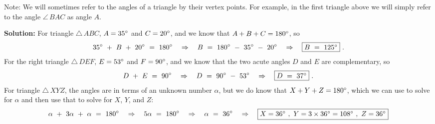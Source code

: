 \begin{exmp}
\begin{center}
 \end{center}
\par\noindent Note: We will sometimes refer to the angles of a triangle by their vertex
points. For example, in the first triangle above we will simply refer to the angle $\angle\,BAC$
as angle $A$.\vspace{1mm}
\par\noindent\textbf{Solution:} For triangle $\triangle\,ABC$, $A = 35^\circ$ and $C = 20^\circ$,
and we know that $A + B + C = 180^\circ$, so
 \begin{displaymath}
  35^\circ ~+~ B ~+~ 20^\circ ~=~ 180^\circ \quad\Rightarrow\quad B ~=~ 180^\circ ~-~
   35^\circ ~-~ 20^\circ \quad\Rightarrow\quad \fbox{$B ~=~ 125^\circ$} ~.
 \end{displaymath}
 For the right triangle $\triangle\,DEF$, $E = 53^\circ$ and $F = 90^\circ$, and we know that
 the two acute angles $D$ and $E$ are complementary, so
 \begin{displaymath}
  D ~+~ E ~=~ 90^\circ \quad\Rightarrow\quad D ~=~ 90^\circ ~-~
   53^\circ \quad\Rightarrow\quad \fbox{$D ~=~ 37^\circ$} ~.
 \end{displaymath}
 For triangle $\triangle\,XYZ$, the angles are in terms of an unknown number $\alpha$, but we do
 know that $X + Y + Z = 180^\circ$, which we can use to solve for $\alpha$ and then use that to
 solve for $X$, $Y$, and $Z$:
 \begin{displaymath}
  \alpha ~+~ 3\alpha ~+~ \alpha ~=~ 180^\circ \quad\Rightarrow\quad 5\alpha ~=~ 180^\circ
  \quad\Rightarrow\quad \alpha ~=~ 36^\circ \quad\Rightarrow\quad \fbox{$X = 36^\circ ~,~
  Y = 3 \times 36^\circ = 108^\circ ~,~ Z = 36^\circ$}
 \end{displaymath}
\end{exmp}
